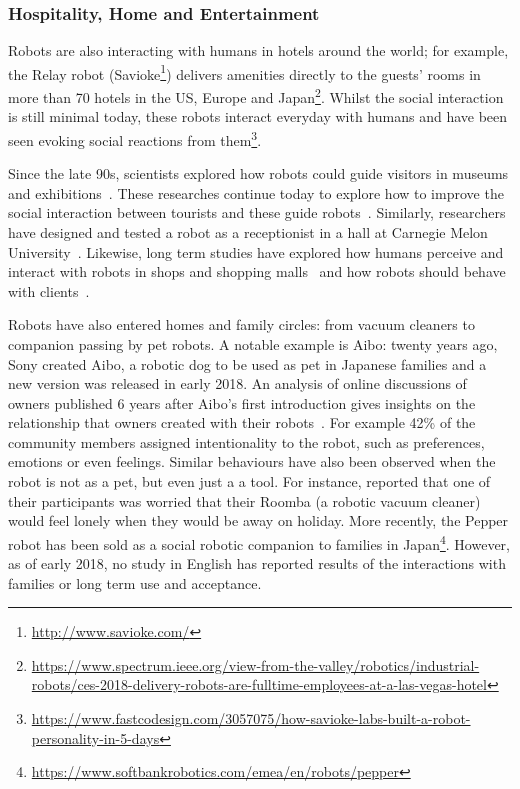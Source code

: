 \subsubsection{Hospitality, Home and Entertainment} 
	
	Robots are also interacting with humans in hotels around the world; for example, the Relay robot (Savioke\footnote{\url{http://www.savioke.com/}}) delivers amenities directly to the guests' rooms in more than 70 hotels in the US, Europe and Japan\footnote{\url{https://www.spectrum.ieee.org/view-from-the-valley/robotics/industrial-robots/ces-2018-delivery-robots-are-fulltime-employees-at-a-las-vegas-hotel}}. Whilst the social interaction is still minimal today, these robots interact everyday with humans and have been seen evoking social reactions from them\footnote{\url{https://www.fastcodesign.com/3057075/how-savioke-labs-built-a-robot-personality-in-5-days}}. 
	
	Since the late 90s, scientists explored how robots could guide visitors in museums and exhibitions~\citep{thrun1999minerva,burgard1999experiences}. These researches continue today to explore how to improve the social interaction between tourists and these guide robots~\citep{bennewitz2005towards}. Similarly, researchers have designed and tested a robot as a receptionist in a hall at Carnegie Melon University~\citep{gockley2005designing}. Likewise, long term studies have explored how humans perceive and interact with robots in shops and shopping malls~\citep{kanda2009affective} and how robots should behave with clients~\citep{kanda2008will}.

    Robots have also entered homes and family circles: from vacuum cleaners to companion passing by pet robots. A notable example is Aibo: twenty years ago, Sony created Aibo, a robotic dog to be used as pet in Japanese families and a new version was released in early 2018. An analysis of online discussions of owners published 6 years after Aibo's first introduction gives insights on the relationship that owners created with their robots~\citep{friedman2003hardware}. For example 42\% of the community members assigned intentionality to the robot, such as preferences, emotions or even feelings. Similar behaviours have also been observed when the robot is not as a pet, but even just a a tool. For instance, \cite{fink2013living} reported that one of their participants was worried that their Roomba (a robotic vacuum cleaner) would feel lonely when they would be away on holiday. More recently, the Pepper robot has been sold as a social robotic companion to families in Japan\footnote{\url{https://www.softbankrobotics.com/emea/en/robots/pepper}}. However, as of early 2018, no study in English has reported results of the interactions with families or long term use and acceptance.
    
